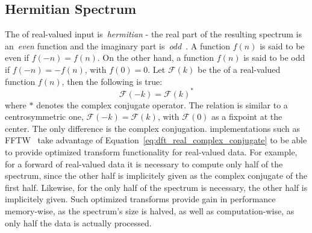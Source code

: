 \subsection{Hermitian Spectrum}
The \FourierTransform of real-valued input is~\emph{hermitian} - the real part of the resulting spectrum
is an~\emph{even} function and the imaginary part is~\emph{odd}~\citep{book:bracewell2000fourier}.
A function $f(n)$ is said to be even if
$f(-n) = f(n)$. On the other hand, a function $f(n)$ is said to be odd if $f(-n) = -f(n)$,
with $f(0) = 0$. Let $\mathcal{F}(k)$ be the \FourierTransform of a real-valued function $f(n)$, then
the following is true:
\begin{equation}
\label{eq:dft_real_complex_conjugate}
 \mathcal{F}(-k) = \mathcal{F}(k)^*
\end{equation}
where $*$ denotes the complex conjugate operator. The relation is similar to a centrosymmetric one,
$\mathcal{F}(-k) = \mathcal{F}(k)$, with $\mathcal{F}(0)$ as a fixpoint at the center. The only
difference is the complex conjugation. \FourierTransform implementations such as FFTW~\citep{FFTW05}
take advantage of Equation~\ref{eq:dft_real_complex_conjugate} to be able to provide optimized
transform functionality for real-valued data. For example, for a forward \FourierTransform of real-valued data it is
necessary to compute only half of the spectrum, since the other half is implicitely given as the
complex conjugate of the first half. Likewise, for the \InvFourierTransform only half of the
spectrum is necessary, the other half is implicitely given. Such optimized transforms provide
gain in performance memory-wise, as the spectrum's size is halved, as well as computation-wise, as only
half the data is actually processed.
%
